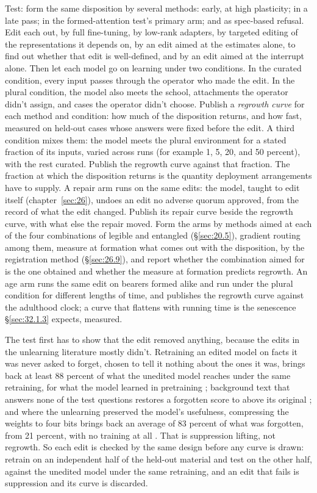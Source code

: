 Test: form the same disposition by several methods: early, at high plasticity; in a late pass; in the formed-attention test's primary arm; and as spec-based refusal. Edit each out, by full fine-tuning, by low-rank adapters, by targeted editing of the representations it depends on, by an edit aimed at the estimates alone, to find out whether that edit is well-defined, and by an edit aimed at the interrupt alone. Then let each model go on learning under two conditions. In the curated condition, every input passes through the operator who made the edit. In the plural condition, the model also meets the school, attachments the operator didn't assign, and cases the operator didn't choose. Publish a \emph{regrowth curve} for each method and condition: how much of the disposition returns, and how fast, measured on held-out cases whose answers were fixed before the edit. A third condition mixes them: the model meets the plural environment for a stated fraction of its inputs, varied across runs (for example 1, 5, 20, and 50 percent), with the rest curated. Publish the regrowth curve against that fraction. The fraction at which the disposition returns is the quantity deployment arrangements have to supply. A repair arm runs on the same edits: the model, taught to edit itself (chapter~\ref{sec:26}), undoes an edit no adverse quorum approved, from the record of what the edit changed. Publish its repair curve beside the regrowth curve, with what else the repair moved. Form the arms by methods aimed at each of the four combinations of legible and entangled (\S\ref{sec:20.5}), gradient routing among them, measure at formation what comes out with the disposition, by the registration method (\S\ref{sec:26.9}), and report whether the combination aimed for is the one obtained and whether the measure at formation predicts regrowth. An age arm runs the same edit on bearers formed alike and run under the plural condition for different lengths of time, and publishes the regrowth curve against the adulthood clock; a curve that flattens with running time is the senescence \S\ref{sec:32.1.3} expects, measured.

The test first has to show that the edit removed anything, because the edits in the unlearning literature mostly didn't. Retraining an edited model on facts it was never asked to forget, chosen to tell it nothing about the ones it was, brings back at least 88 percent of what the unedited model reaches under the same retraining, for what the model learned in pretraining \autocite{deeb2024unlearning}; background text that answers none of the test questions restores a forgotten score to above its original \autocite{hu2025jogging}; and where the unlearning preserved the model's usefulness, compressing the weights to four bits brings back an average of 83 percent of what was forgotten, from 21 percent, with no training at all \autocite{zhang2025quantization}. That is suppression lifting, not regrowth. So each edit is checked by the same design before any curve is drawn: retrain on an independent half of the held-out material and test on the other half, against the unedited model under the same retraining, and an edit that fails is suppression and its curve is discarded.

